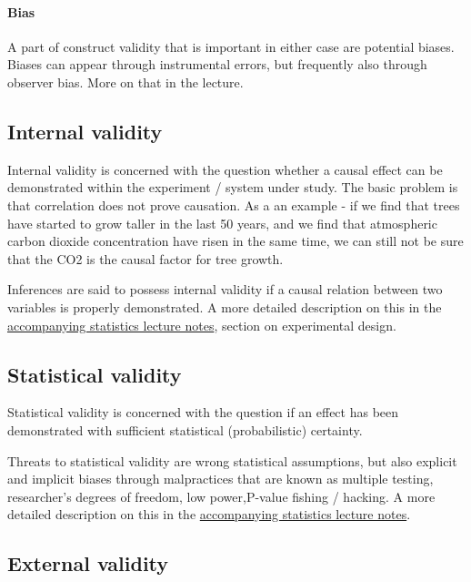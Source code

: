 \documentclass{tufte-book}
\begin{document}
\paragraph{Bias} A part of construct validity that is important in either case are potential biases. Biases can appear through instrumental errors, but frequently also through observer bias. More on that in the lecture.


\subsection{Internal validity}

Internal validity is concerned with the question whether a causal effect can be demonstrated within the experiment / system under study. The basic problem is that correlation does not prove causation. As a an example - if we find that trees have started to grow taller in the last 50 years, and we find that atmospheric carbon dioxide concentration have risen in the same time, we can still not be sure that the CO2 is the causal factor for tree growth.

Inferences are said to possess internal validity if a causal relation between two variables is properly demonstrated. A more detailed description on this in the \href{https://florianhartig.github.io/Statistics/}{accompanying statistics lecture notes}, section on experimental design.


\subsection{Statistical validity}

Statistical validity is concerned with the question if an effect has been demonstrated with sufficient statistical (probabilistic) certainty.

Threats to statistical validity are wrong statistical assumptions, but also explicit and implicit biases through malpractices that are known as multiple testing, researcher’s degrees of freedom, low power,P-value fishing / hacking. A more detailed description on this in the \href{https://florianhartig.github.io/Statistics/}{accompanying statistics lecture notes}.

\subsection{External validity}
\end{document}
